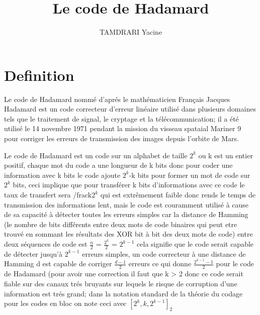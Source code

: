\documentclass{article}
\author{TAMDRARI Yacine}
\title{Le code de Hadamard}
\begin{document}
\maketitle

\section{Definition}
Le code de Hadamard nommé d'aprés le mathématicien Français Jacques 
Hadamard est un code correcteur d'erreur linéaire utilisé dans plusieurs 
domaines tels que le traitement de signal, le cryptage et la 
télécommunication; il a été utilisé le 14 novembre 1971 pendant la mission
du visseau spataial Mariner 9 pour corriger les erreurs de transmission des
images depuis l'orbite de Mars.

Le code de Hadamard est un code sur un alphabet de taille $2^k$ ou k est un
entier positif, chaque mot du code a une longueur de k bits donc pour coder
une information avec k bits le code ajoute $2^k$-k bits pour former un mot
de code sur $2^k$ bits, ceci implique que pour transférer k bits 
d'informations avec ce code le taux de transfert sera /frac{k}{$2^k$} qui 
est extrêmement faible donc rends le temps de transmission des informations
lent, mais le code est couramment utilisé à cause de sa capacité à détecter
toutes les erreurs simples car la distance de Hamming (le nombre de bits 
différents entre deux mots de code binaires qui peut etre trouvé en sommant
les résultats des XOR bit à bit des deux mots de code) entre deux séquences
de code est $\frac{n}{2}$ = $\frac{2^k}{2}$ = $2^{k-1}$ cela signifie que 
le code serait capable de détecter jusqu'à $2^{k-1}$ erreurs simples, un 
code correcteur à une distance de Hamming d est capable de corriger 
$\frac{d-1}{2}$ erreurs ce qui donne $\frac{2^{k-1}-1}{2}$ pour le code de 
Hadamard (pour avoir une correction il faut que k > 2 donc ce code serait 
fiable sur des canaux trés bruyants sur lequels le risque de corruption 
d'une information est trés grand; dans la notation standard de la théorie 
du codage pour les codes en bloc on note ceci avec $[2^k, k, 2^{k-1}]_2$
\end{document}
